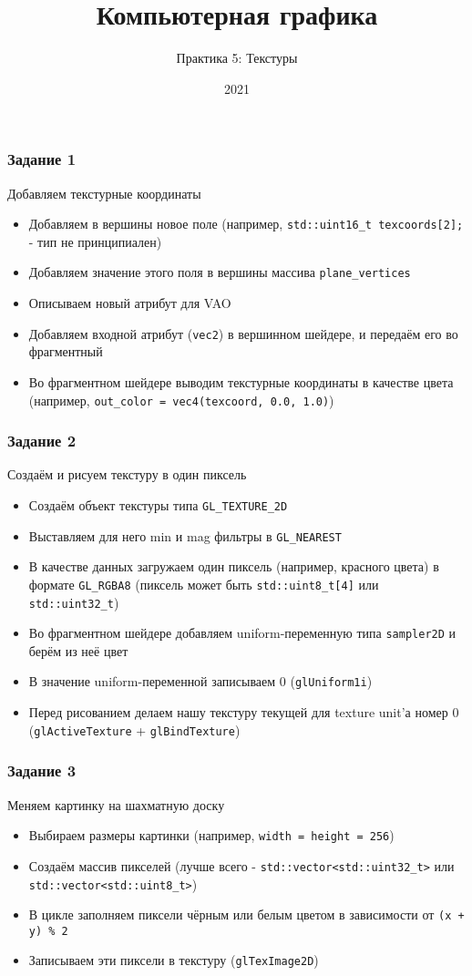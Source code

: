\documentclass{beamer}
\title{Компьютерная графика}
\subtitle{Практика 5: Текстуры}
\date{2021}
\begin{document}
\frame{\titlepage}

\begin{frame}[fragile]
\frametitle{Задание 1}
Добавляем текстурные координаты
\begin{itemize}
\item Добавляем в вершины новое поле (например, \verb|std::uint16_t texcoords[2];| - тип не принципиален)
\pause
\item Добавляем значение этого поля в вершины массива \verb|plane_vertices|
\pause
\item Описываем новый атрибут для VAO
\pause
\item Добавляем входной атрибут (\verb|vec2|) в вершинном шейдере, и передаём его во фрагментный
\pause
\item Во фрагментном шейдере выводим текстурные координаты в качестве цвета (например, \verb|out_color = vec4(texcoord, 0.0, 1.0)|)
\end{itemize}
\end{frame}

\begin{frame}[fragile]
\frametitle{Задание 2}
Создаём и рисуем текстуру в один пиксель
\begin{itemize}
\item Создаём объект текстуры типа \verb|GL_TEXTURE_2D|
\pause
\item Выставляем для него min и mag фильтры в \verb|GL_NEAREST|
\pause
\item В качестве данных загружаем один пиксель (например, красного цвета) в формате \verb|GL_RGBA8| (пиксель может быть \verb|std::uint8_t[4]| или \verb|std::uint32_t|)
\pause
\item Во фрагментном шейдере добавляем uniform-переменную типа \verb|sampler2D| и берём из неё цвет
\pause
\item В значение uniform-переменной записываем 0 (\verb|glUniform1i|)
\pause
\item Перед рисованием делаем нашу текстуру текущей для texture unit'а номер 0 (\verb|glActiveTexture| + \verb|glBindTexture|)
\end{itemize}
\end{frame}

\begin{frame}[fragile]
\frametitle{Задание 3}
Меняем картинку на шахматную доску
\begin{itemize}
\item Выбираем размеры картинки (например, \verb|width = height = 256|)
\pause
\item Создаём массив пикселей (лучше всего - \verb|std::vector<std::uint32_t>| или \verb|std::vector<std::uint8_t>|)
\pause
\item В цикле заполняем пиксели чёрным или белым цветом в зависимости от \verb|(x + y) % 2|
\pause
\item Записываем эти пиксели в текстуру (\verb|glTexImage2D|)
\end{itemize}
\end{frame}
\end{document}
